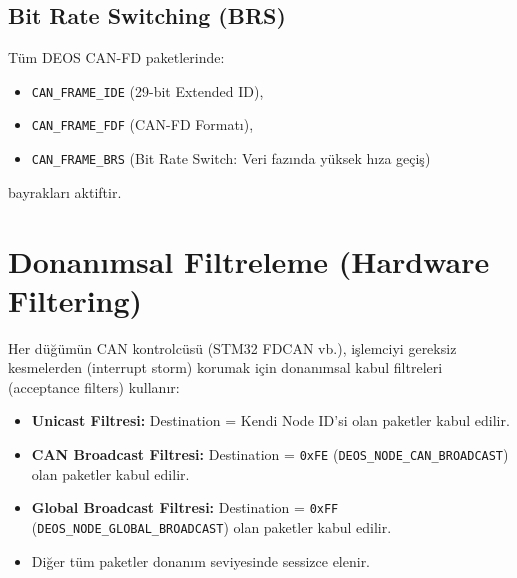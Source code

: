 \documentclass[a4paper,10pt]{article}
\newcommand{\hex}[1]{\texttt{0x#1}}
\newcommand{\code}[1]{\texttt{#1}}
\begin{document}
\subsection{Bit Rate Switching (BRS)}

Tüm DEOS CAN-FD paketlerinde:
\begin{itemize}
    \item \code{CAN\_FRAME\_IDE} (29-bit Extended ID),
    \item \code{CAN\_FRAME\_FDF} (CAN-FD Formatı),
    \item \code{CAN\_FRAME\_BRS} (Bit Rate Switch: Veri fazında yüksek hıza geçiş)
\end{itemize}
bayrakları aktiftir.

\section{Donanımsal Filtreleme (Hardware Filtering)}

Her düğümün CAN kontrolcüsü (STM32 FDCAN vb.), işlemciyi gereksiz kesmelerden (interrupt storm) korumak için donanımsal kabul filtreleri (acceptance filters) kullanır:
\begin{itemize}
    \item \textbf{Unicast Filtresi:} Destination = Kendi Node ID'si olan paketler kabul edilir.
    \item \textbf{CAN Broadcast Filtresi:} Destination = \hex{FE} (\code{DEOS\_NODE\_CAN\_BROADCAST}) olan paketler kabul edilir.
    \item \textbf{Global Broadcast Filtresi:} Destination = \hex{FF} (\code{DEOS\_NODE\_GLOBAL\_BROADCAST}) olan paketler kabul edilir.
    \item Diğer tüm paketler donanım seviyesinde sessizce elenir.
\end{itemize}
\end{document}
